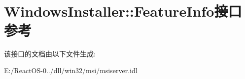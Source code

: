 \hypertarget{interface_windows_installer_1_1_feature_info}{}\section{Windows\+Installer\+:\+:Feature\+Info接口 参考}
\label{interface_windows_installer_1_1_feature_info}


该接口的文档由以下文件生成\+:\begin{DoxyCompactItemize}
\item 
E\+:/\+React\+O\+S-\/0../dll/win32/msi/msiserver.\+idl\end{DoxyCompactItemize}
